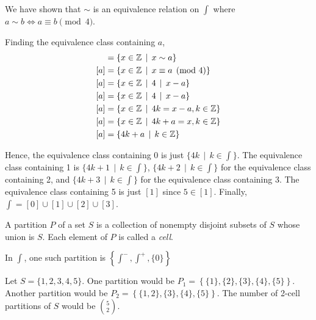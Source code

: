     \begin{example}
        We have shown that \(\sim\) is an equivalence relation on \(\int\) where \(a \sim b \iff a \equiv b \pmod{4}\).

        Finding the equivalence class containing \(a\),
        \begin{align*}
            [a] &= \{x\in\int \,\mid\, x \sim a\} \\
            [a] &= \{x\in\int \,\mid\, x \equiv a \pmod{4}\} \\
            [a] &= \{x\in\int \,\mid\, 4 \divs x - a\} \\
            [a] &= \{x\in\int \,\mid\, 4 \divs x - a\} \\
            [a] &= \{x\in\int \,\mid\, 4k = x - a, k\in\int\} \\
            [a] &= \{x\in\int \,\mid\, 4k + a = x, k\in\int\} \\
            [a] &= \{4k + a\,\mid\, k\in\int\}
        \end{align*}

        Hence, the equivalence class containing 0 is just \(\{4k \,\mid\, k\in\int\}\). The equivalence class containing 1 is \(\{4k + 1\,\mid\, k\in\int\}\), \(\{4k + 2\,\mid\, k\in\int\}\) for the equivalence class containing 2, and \(\{4k + 3\,\mid\, k\in\int\}\) for the equivalence class containing 3. The equivalence class containing 5 is just \([1]\) since \(5\in[1]\). Finally, \(\int = [0]\cup[1]\cup[2]\cup[3]\).
    \end{example}

    \begin{dfn}
        A partition \(P\) of a set \(S\) is a collection of nonempty disjoint subsets of \(S\) whose union is \(S\). Each element of \(P\) is called a \emph{cell}.
    \end{dfn}

    \begin{example}
        In \(\int\), one such partition is \(\left\{\int^-, \int^+, \{0\}\right\}\)
    \end{example}

    \begin{example}
        Let \(S = \{1, 2, 3, 4, 5\}\). One partition would be \(P_1 = \left\{\{1\}, \{2\}, \{3\}, \{4\}, \{5\}\right\}\). Another partition would be \(P_2 = \left\{\{1,2\}, \{3\}, \{4\}, \{5\}\right\}\). The number of 2-cell partitions of \(S\) would be \(\binom{5}{2}\).
    \end{example}

